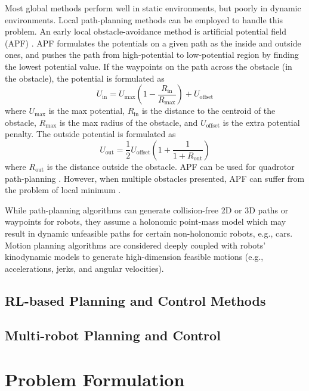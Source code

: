 \documentclass[letterpaper,journal,twoside]{IEEEtran}
\begin{document}
Most global methods perform well in static environments, but poorly in dynamic environments. 
Local path-planning methods can be employed to handle this problem. 
An early local obstacle-avoidance method is artificial potential field (APF) \cite{warren1989global}.
APF formulates the potentials on a given path as the inside and outside ones, and pushes the path from high-potential to low-potential region by finding the lowest potential value. 
If the waypoints on the path across the obstacle (in the obstacle), the potential is formulated as 
\begin{equation}
\label{eq:APF_in}
U_{\text{in}} = 
U_{\text{max}}(1 - \frac{R_{\text{in}}}{R_{\text{max}}}) + 
U_{\text{offset}}
\end{equation}
where $U_{\text{max}}$ is the max potential, $R_{\text{in}}$ is the distance to the centroid of the obstacle, $R_{\text{max}}$ is the max radius of the obstacle, and $U_{\text{offset}}$ is the extra potential penalty.
The outside potential is formulated as 
\begin{equation}
\label{eq:APF_out}
U_{\text{out}} = 
\frac{1}{2}U_{\text{offset}}(1+ \frac{1}{1+R_\text{out}})
\end{equation}
where $R_{\text{out}}$ is the distance outside the obstacle.
APF can be used for quadrotor path-planning \cite{chen2016uav}.
However, when multiple obstacles presented, APF can suffer from the problem of local minimum \cite{koren1991potential}.



While path-planning algorithms can generate collision-free 2D or 3D paths or waypoints for robots, they assume a holonomic point-mass model which may result in dynamic unfeasible paths for certain non-holonomic robots, e.g., cars. 
Motion planning algorithms are considered deeply coupled with robots' kinodynamic models to generate high-dimension feasible motions (e.g., accelerations, jerks, and angular velocities). 

\subsection{RL-based Planning and Control Methods}

\subsection{Multi-robot Planning and Control}

\section{Problem Formulation}



\end{document}
